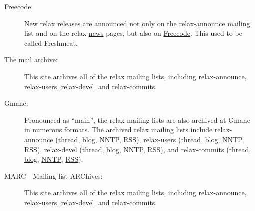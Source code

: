 \begin{description}
\item[Freecode:]  New relax releases are announced not only on the \href{https://mail.gna.org/public/relax-announce/}{relax-announce} mailing list and on the relax \href{https://gna.org/news/?group=relax}{news} pages, but also on \href{http://freecode.com/projects/nmr-relax}{Freecode}.  This used to be called Freshmeat.
\item[The mail archive:]  This site archives all of the relax mailing lists, including \href{http://mail-archive.com/relax-announce@gna.org/}{relax-announce}, \href{http://mail-archive.com/relax-users@gna.org/}{relax-users}, \href{http://mail-archive.com/relax-devel@gna.org/}{relax-devel}, and \href{http://mail-archive.com/relax-commits@gna.org/}{relax-commits}.
\item[Gmane:]  Pronounced as ``main'', the relax mailing lists are also archived at Gmane in numerous formats.  The archived relax mailing lists include relax-announce (\href{http://news.gmane.org/gmane.science.nmr.relax.announce}{thread}, \href{http://blog.gmane.org/gmane.science.nmr.relax.announce}{blog}, \href{nntp://news.gmane.org/gmane.science.nmr.relax.announce}{NNTP}, \href{http://rss.gmane.org/messages/excerpts/gmane.science.nmr.relax.announce}{RSS}), relax-users (\href{http://news.gmane.org/gmane.science.nmr.relax.user}{thread}, \href{http://blog.gmane.org/gmane.science.nmr.relax.user}{blog}, \href{nntp://news.gmane.org/gmane.science.nmr.relax.user}{NNTP}, \href{http://rss.gmane.org/messages/excerpts/gmane.science.nmr.relax.user}{RSS}), relax-devel (\href{http://news.gmane.org/gmane.science.nmr.relax.devel}{thread}, \href{http://blog.gmane.org/gmane.science.nmr.relax.devel}{blog}, \href{nntp://news.gmane.org/gmane.science.nmr.relax.devel}{NNTP}, \href{http://rss.gmane.org/messages/excerpts/gmane.science.nmr.relax.devel}{RSS}), and relax-commits (\href{http://news.gmane.org/gmane.science.nmr.relax.scm}{thread}, \href{http://blog.gmane.org/gmane.science.nmr.relax.scm}{blog}, \href{nntp://news.gmane.org/gmane.science.nmr.relax.scm}{NNTP}, \href{http://rss.gmane.org/messages/excerpts/gmane.science.nmr.relax.scm}{RSS}).
\item[MARC -  Mailing list ARChives:]  This site archives all of the relax mailing lists, including \href{http://marc.info/?l=relax-announce&r=1&w=2}{relax-announce}, \href{http://marc.info/?l=relax-users&r=1&w=2}{relax-users}, \href{http://marc.info/?l=relax-devel&r=1&w=2}{relax-devel}, and \href{http://marc.info/?l=relax-commits&r=1&w=2}{relax-commits}.

\end{description}
